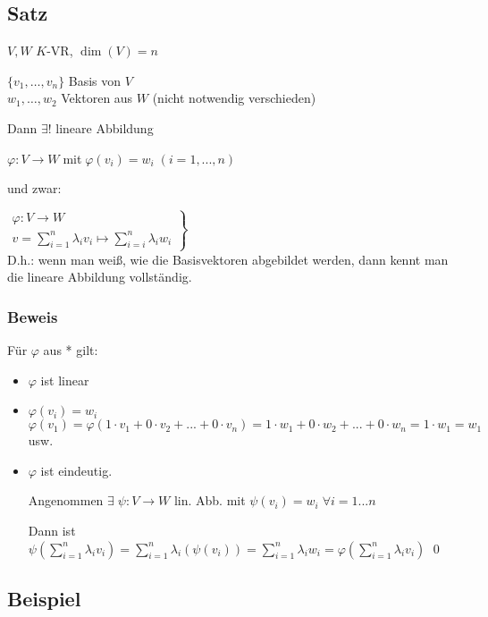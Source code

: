 \subsection{Satz}

$V,W$ $K$-VR, $\dim(V)=n$

$\{v_1, \dots, v_n\}$ Basis von $V$ \\
$w_1,\dots, w_2 $ Vektoren aus $W$ (nicht notwendig verschieden)

Dann $\exists!$ lineare Abbildung



$\varphi: V \rightarrow W \;$mit$\; \varphi(v_i) = w_i \; (i=1,...,n)$

und zwar: 

$\left.
\begin{array}{l}
\varphi: V \rightarrow W\\
v=\sum_{i=1}^{n} \lambda_i v_i \mapsto \sum_{i=i}^{n} \lambda_i w_i
\end{array}
\right\rbrace$\huge*\normalsize\\

D.h.: wenn man weiß, wie die Basisvektoren abgebildet werden, dann kennt man die lineare Abbildung vollständig.

\subsubsection*{Beweis}
Für $\varphi$ aus * gilt:
\begin{itemize}
	\item $\varphi$ ist linear
	\item $\varphi(v_i) = w_i$\\
	$\varphi(v_1)=\varphi(1\cdot v_1 + 0 \cdot v_2 + ... + 0 \cdot v_n) = 1 \cdot w_1 + 0 \cdot w_2 + ... + 0 \cdot w_n = 1 \cdot w_1 = w_1$ usw.
	\item $\varphi$ ist eindeutig.
	
	Angenommen $\exists \;\psi: V \rightarrow W$ lin. Abb. mit $\psi(v_i) = w_i \; \forall i=1...n$
	
	Dann ist $\psi(\sum_{i=1}^{n} \lambda_i v_i) = \sum_{i=1}^{n} \lambda_i(\psi(v_i)) = \sum_{i=1}^{n} \lambda_i w_i = \varphi(\sum_{i=1}^{n} \lambda_i v_i) $
	\qed
\end{itemize}

\subsection{Beispiel}

